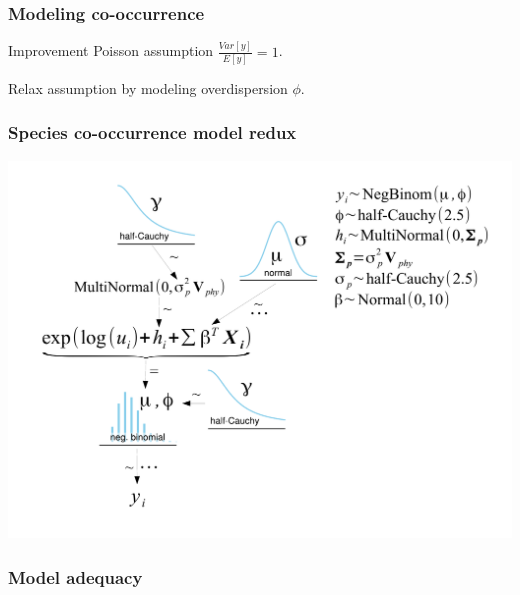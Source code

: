 \documentclass{beamer}
\begin{document}
\begin{frame}
  \frametitle{Modeling co-occurrence}
  \begin{block}{Improvement}
    Poisson assumption \(\frac{Var[y]}{E[y]} = 1\).

    Relax assumption by modeling overdispersion \(\phi\).
  \end{block}
\end{frame}

\begin{frame}
  \frametitle{Species co-occurrence model redux}
  \begin{center}
    \includegraphics[height = 0.8\textheight, width = \textwidth,  keepaspectratio = true]{figure/mammal_deg_over_model}
  \end{center}
\end{frame}

\begin{frame}
  \frametitle{Model adequacy}

\end{frame}
\end{document}

